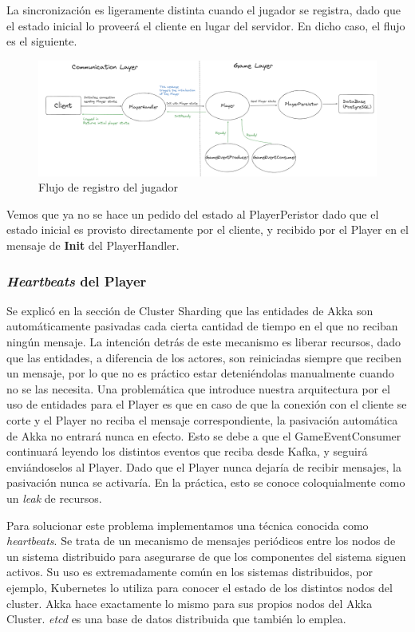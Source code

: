 \noindent La sincronización es ligeramente distinta cuando el jugador se registra, dado que el estado inicial lo proveerá el cliente en lugar del servidor. En dicho caso, el flujo es el siguiente.

\begin{figure}[htbp]
    \centering
    \includegraphics[width=1\textwidth]{../assets/player-init-register-flow.png}
    \caption{Flujo de registro del jugador}
\end{figure}

Vemos que ya no se hace un pedido del estado al PlayerPeristor dado que el estado inicial es provisto directamente por el cliente, y recibido por el Player en el mensaje de \textbf{Init} del PlayerHandler.

\subsubsection{\textit{Heartbeats} del Player}

\noindent Se explicó en la sección de Cluster Sharding que las entidades de Akka son automáticamente pasivadas cada cierta cantidad de tiempo en el que no reciban ningún mensaje.
La intención detrás de este mecanismo es liberar recursos, dado que las entidades, a diferencia de los actores, son reiniciadas siempre que reciben un mensaje, por lo que no es práctico estar
deteniéndolas manualmente cuando no se las necesita. Una problemática que introduce nuestra arquitectura por el uso de entidades para el Player es que en caso de que la conexión con el cliente se corte y el Player
no reciba el mensaje correspondiente, la pasivación automática de Akka no entrará nunca en efecto. Esto se debe a que el GameEventConsumer continuará leyendo los distintos eventos que reciba desde Kafka, y seguirá enviándoselos
al Player. Dado que el Player nunca dejaría de recibir mensajes, la pasivación nunca se activaría. En la práctica, esto se conoce coloquialmente como un \textit{leak} de recursos.

Para solucionar este problema implementamos una técnica conocida como \textit{heartbeats}. Se trata de un mecanismo de mensajes periódicos entre los nodos de un sistema distribuido para asegurarse de que los componentes del sistema
siguen activos. Su uso es extremadamente común en los sistemas distribuidos, por ejemplo, Kubernetes lo utiliza para conocer el estado de los distintos nodos del cluster. Akka hace exactamente lo mismo para sus propios nodos del Akka Cluster.
\textit{etcd} es una base de datos distribuida que también lo emplea.

